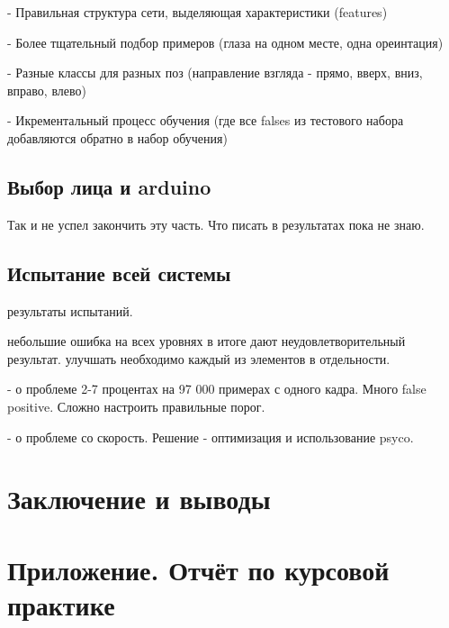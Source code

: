 \documentclass[12pt]{report}
\begin{document}
- Правильная структура сети, выделяющая характеристики (features)

- Более тщательный подбор примеров (глаза на одном месте, одна ореинтация)

- Разные классы для разных поз (направление взгляда - прямо, вверх, вниз, вправо, влево)

- Икрементальный процесс обучения (где все falses из тестового набора добавляются обратно в набор обучения)
\section{Выбор лица и arduino}
Так и не успел закончить эту часть. Что писать в результатах пока не знаю.
\section{Испытание всей системы}
результаты испытаний.

небольшие ошибка на всех уровнях в итоге дают неудовлетворительный результат. улучшать необходимо каждый из элементов в отдельности.

- о проблеме 2-7 процентах на 97 000 примерах с одного кадра. Много false positive. Сложно настроить правильные порог.

- о проблеме со скорость. Решение - оптимизация и использование psyco.

\chapter*{Заключение и выводы}
\thispagestyle{fancy}


\appendix
\chapter{Приложение. Отчёт по курсовой практике}









\end{document}

